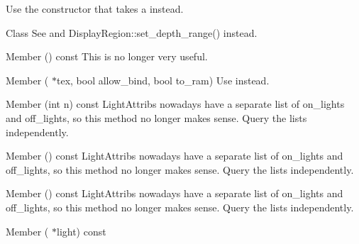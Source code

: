 \begin{DoxyRefList}
\label{deprecated__deprecated000053}%
%
Use the constructor that takes a  instead.  
\item[Class \doxylink{classDepthOffsetAttrib}{Depth\+Offset\+Attrib} ]\label{deprecated__deprecated000041}%
%
See  and Display\+Region\+::set\+\_\+depth\+\_\+range() instead.  
\item[Member \doxylink{classGeom_afc5dd05d9f365a2acba5221f368ec455}{Geom\+::get\+\_\+usage\+\_\+hint} () const]\label{deprecated__deprecated000025}%
%
This is no longer very useful.  
\item[Member \doxylink{classGraphicsOutput_a64b4b44e98a9122121db51631f8d9553}{Graphics\+Output\+::setup\+\_\+render\+\_\+texture} (\doxylink{classTexture}{Texture} \texorpdfstring{$\ast$}{*}tex, bool allow\+\_\+bind, bool to\+\_\+ram)]\label{deprecated__deprecated000019}%
%
Use  instead.  
\item[Member \doxylink{classLightAttrib_afb2d56e944a0153e8c4e58f9ff0a7950}{Light\+Attrib\+::get\+\_\+light} (int n) const]\label{deprecated__deprecated000048}%
%
Light\+Attribs nowadays have a separate list of on\+\_\+lights and off\+\_\+lights, so this method no longer makes sense. Query the lists independently.  
\item[Member \doxylink{classLightAttrib_a2873602675e4fc6cb22826521f361817}{Light\+Attrib\+::get\+\_\+num\+\_\+lights} () const]\label{deprecated__deprecated000047}%
%
Light\+Attribs nowadays have a separate list of on\+\_\+lights and off\+\_\+lights, so this method no longer makes sense. Query the lists independently.  
\item[Member \doxylink{classLightAttrib_ad74bacbdae55dc6d7a8ad7688dfba6a3}{Light\+Attrib\+::get\+\_\+operation} () const]\label{deprecated__deprecated000046}%
%
Light\+Attribs nowadays have a separate list of on\+\_\+lights and off\+\_\+lights, so this method no longer makes sense. Query the lists independently.  
\item[Member \doxylink{classLightAttrib_ab1325d3b8793d12690fd33a93147bb72}{Light\+Attrib\+::has\+\_\+light} (\doxylink{classLight}{Light} \texorpdfstring{$\ast$}{*}light) const]\label{deprecated__deprecated000049}%

\end{DoxyRefList}
